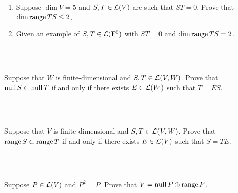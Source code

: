 \begin{exercise}
    \vspace{-7.5mm}
    \begin{enumerate}[label=(\alph*)]
        \item Suppose $\dim V = 5$ and $S,T \in \mathcal{L}(V)$ are such that $ST = 0$. Prove that $\dim \operatorname{\text{range}} TS \leq 2$.
        \item Given an example of $S,T \in \mathcal{L}(\mathbf{F}^5)$ with $ST = 0$ and $\dim \operatorname{\text{range}} TS = 2$. \\
    \end{enumerate}
\end{exercise}

\begin{solution}
    \\ \td \\
\end{solution}

\begin{exercise}
    Suppose that $W$ is finite-dimensional and $S,T \in \mathcal{L}(V,W)$. Prove that $\operatorname{\text{null}} S \subset \operatorname{\text{null}} T$ if and only if there exists $E \in \mathcal{L}(W)$ such that $T = ES$. \\
\end{exercise}

\begin{solution}
    \\ \td \\
\end{solution}

\begin{exercise}
    Suppose that $V$ is finite-dimensional and $S,T \in \mathcal{L}(V,W)$. Prove that $\operatorname{\text{range}} S \subset \operatorname{\text{range}} T$ if and only if there exists $E \in \mathcal{L}(V)$ such that $S = TE$. \\
\end{exercise}

\begin{solution}
    \\ \td \\
\end{solution}

\begin{exercise}
    Suppose $P \in \mathcal{L}(V)$ and $P^2 = P$. Prove that $V = \operatorname{\text{null}} P \oplus \operatorname{\text{range}} P$. \\
\end{exercise}

\begin{solution}
    \\ \td \\
\end{solution}

